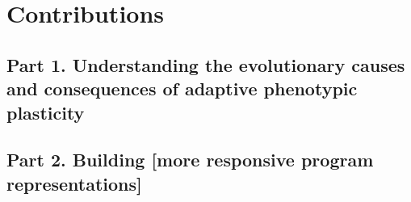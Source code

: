 \section{Contributions}



\subsection{Part 1. Understanding the evolutionary causes and consequences of adaptive phenotypic plasticity}

\subsection{Part 2. Building [more responsive program representations]}
